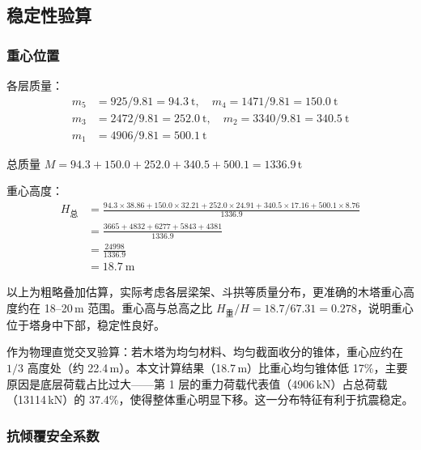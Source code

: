 \documentclass[12pt,a4paper,UTF8]{ctexart}
\begin{document}
\subsection{稳定性验算}

\subsubsection{重心位置}
\label{sec:cg}

各层质量：
\begin{align*}
    m_5 & = 925 / 9.81 = 94.3\ \text{t},\quad
    m_4 = 1471 / 9.81 = 150.0\ \text{t}          \\
    m_3 & = 2472 / 9.81 = 252.0\ \text{t},\quad
    m_2 = 3340 / 9.81 = 340.5\ \text{t}          \\
    m_1 & = 4906 / 9.81 = 500.1\ \text{t}
\end{align*}

总质量 $M = 94.3 + 150.0 + 252.0 + 340.5 + 500.1 = 1336.9$\,t

重心高度：
\[
    \begin{aligned}
        H_{\text{总}} & = \frac{94.3 \times 38.86 + 150.0 \times 32.21 + 252.0 \times 24.91 + 340.5 \times 17.16 + 500.1 \times 8.76}{1336.9} \\
                     & = \frac{3665 + 4832 + 6277 + 5843 + 4381}{1336.9}                                                                     \\
                     & = \frac{24998}{1336.9}                                                                                                \\
                     & = 18.7\ \text{m}
    \end{aligned}
\]

以上为粗略叠加估算，实际考虑各层梁架、斗拱等质量分布，更准确的木塔重心高度约在 18--20\,m 范围。重心高与总高之比 $H_{\text{重}} / H = 18.7 / 67.31 = 0.278$，说明重心位于塔身中下部，稳定性良好。

作为物理直觉交叉验算：若木塔为均匀材料、均匀截面收分的锥体，重心应约在 $1/3$ 高度处（约 22.4\,m）。本文计算结果（18.7\,m）比重心均匀锥体低 17\%，主要原因是底层荷载占比过大——第 1 层的重力荷载代表值（4906\,kN）占总荷载（13114\,kN）的 37.4\%，使得整体重心明显下移。这一分布特征有利于抗震稳定。

\subsubsection{抗倾覆安全系数}
\end{document}
